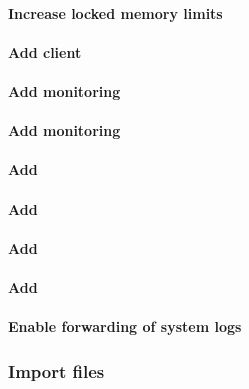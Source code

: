 \documentclass[letterpaper]{article}
\begin{document}
\paragraph{Increase locked memory limits}


\paragraph{Add \Lustre{} client} \label{sec:lustre_client}




\paragraph{Add \Nagios{} monitoring}


\paragraph{Add \Ganglia{} monitoring}


\paragraph{Add \clustershell{}}


\clearpage
\paragraph{Add \genders{}}


\paragraph{Add \conman{}} \label{sec:add_conman}


\paragraph{Add \beegfs{}} \label{sec:add_beegfs}


\paragraph{Enable forwarding of system logs} \label{sec:add_syslog}


\subsubsection{Import files} \label{sec:file_import}






\end{document}
